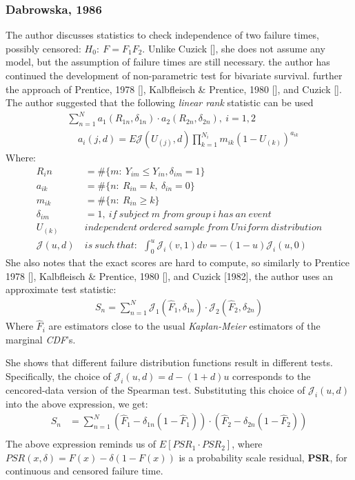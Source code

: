 \documentclass[]{article}
\begin{document}
\subsubsection{Dabrowska, 1986 \cite{dabrowska1986rank}}
The author discusses statistics to check independence of two failure times, possibly censored: $H_0:~F=F_1 F_2$. Unlike Cuzick [\cite{cuzick1982rank}], she does not assume any model, but the assumption of failure times are still necessary. the author has continued the development of non-parametric test for bivariate survival. further the approach of Prentice, 1978 [\cite{prentice1978linear}], Kalbfleisch \& Prentice, 1980 [\cite{kalbfleisch2011statistical}], and Cuzick [\cite{cuzick1982rank}]. The author suggested that  the following \emph{linear rank} statistic can be used
	$$
	\begin{aligned}
		 &\sum_{n=1}^N a_1(R_{1n}, \delta_{1n})\cdot a_2(R_{2n}, \delta_{2n}), ~i=1,2\\
		 &~~~~~ a_i(j,d) = E\mathcal{J}(U_{(j)}, d)\prod_{k=1}^{N_i} m_{ik}(1-U_{(k)})^{a_{ik}}
	\end{aligned}
	$$
Where: 
	$$
	\begin{aligned}
		 R_in &= \#\{m:~Y_{im} \leq Y_{in}, \delta_{im}=1   \}\\
		 a_{ik} &= \# \{n: ~R_{in}=k,~\delta_{in}=0\}\\
		 m_{ik} &= \# \{n: ~R_{in}\geq k\}\\
		 \delta_{im}&=1,~if~subject ~m~from~group~i~has~an~event\\
		 U_{(k)}~&independent ~ordered~sample~from~Uniform~distribution\\
		 \mathcal{J}(u,d) ~&is~such~that:~~\int_0^u \mathcal{J}_i(v,1)dv = -(1-u)\mathcal{J}_i(u,0)
	\end{aligned}
	$$
She also notes that the exact scores are hard to compute, so similarly to Prentice 1978 [\cite{prentice1978linear}], Kalbfleisch \& Prentice, 1980 [\cite{kalbfleisch2011statistical}], and Cuzick [1982], the author uses an approximate test statistic:
	$$
	\begin{aligned}
		 S_n = \sum_{n=1}^N \mathcal{J}_1( \hat{F}_1, \delta_{1n}) \cdot \mathcal{J}_2( \hat{F}_2, \delta_{2n})
	\end{aligned}
	$$
Where $\hat{F}_i$ are estimators close to the usual \emph{Kaplan-Meier} estimators of the marginal \emph{CDF}'s.

She shows that different failure distribution functions result in different tests. Specifically, the choice of $\mathcal{J}_i(u,d) =d-(1+d)u$ corresponds to the cencored-data version of the Spearman test. Substituting this choice of $\mathcal{J}_i(u,d)$ into the above expression, we get:
	$$
	\begin{aligned}
		 S_n &= \sum_{n=1}^N (\hat{F}_1 - \delta_{1n}(1-\hat{F}_1))\cdot (\hat{F}_2 - \delta_{2n}(1-\hat{F}_2))\\
	\end{aligned}
	$$
The above expression reminds us of $E[PSR_1 \cdot PSR_2]$, where $PSR(x, \delta) = F(x)-\delta(1-F(x))$ is a probability scale residual, \textbf{PSR}, for continuous and censored failure time. 
\end{document}
